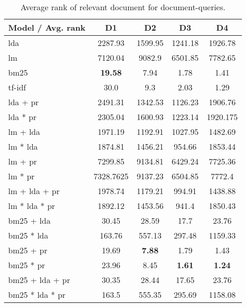 \begin{table}[h]
	\centering
	\caption{Average rank of relevant document for document-queries.}
	\begin{tabular}{l|c|c|c|c}
		Model / Avg. rank & D1 & D2 & D3 & D4 \\
		\midrule
		\gls{lda} & 2287.93 & 1599.95 & 1241.18 & 1926.78 \\
		\gls{lm} & 7120.04 & 9082.9 & 6501.85 & 7782.65 \\
		\gls{bm25} & \textbf{19.58} & 7.94 & 1.78 & 1.41 \\
		\gls{tf-idf} & 30.0 & 9.3 & 2.03 & 1.29 \\
		\gls{lda} + \gls{pr} & 2491.31 & 1342.53 & 1126.23 & 1906.76\\
		\gls{lda} * \gls{pr} & 2305.04 & 1600.93 & 1223.14 & 1920.175\\
		\gls{lm} + \gls{lda} & 1971.19 & 1192.91 & 1027.95 & 1482.69 \\
		\gls{lm} * \gls{lda} & 1874.81 & 1456.21 & 954.66 & 1853.44 \\
		\gls{lm} + \gls{pr} & 7299.85 & 9134.81 & 6429.24 & 7725.36 \\
		\gls{lm} * \gls{pr} & 7328.7625 & 9137.23 & 6504.85 & 7772.4\\
		\gls{lm} + \gls{lda} + \gls{pr} & 1978.74 & 1179.21 & 994.91 & 1438.88 \\
		\gls{lm} * \gls{lda} * \gls{pr} & 1892.12 & 1453.56 & 941.4 & 1850.43 \\
		\gls{bm25} + \gls{lda} & 30.45 & 28.59 & 17.7 & 23.76 \\
		\gls{bm25} * \gls{lda} & 163.76 & 557.13 & 297.48 & 1159.33 \\
		\gls{bm25} + \gls{pr} & 19.69 & \textbf{7.88} & 1.79 & 1.43\\
		\gls{bm25} * \gls{pr} & 23.96 & 8.45 & \textbf{1.61} & \textbf{1.24}\\
		\gls{bm25} + \gls{lda} + \gls{pr} & 30.35 & 28.44 & 17.65 & 23.76\\
		\gls{bm25} * \gls{lda} * \gls{pr} & 163.5 & 555.35 & 295.69 & 1158.08\\
	\end{tabular}
	
	\label{tab:hit_results}
\end{table}
